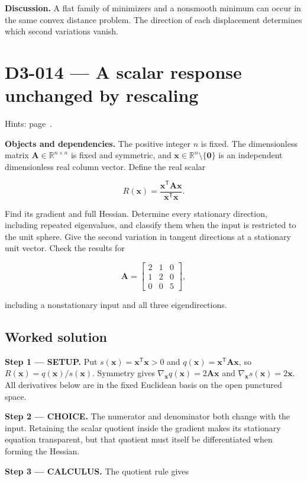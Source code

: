 \documentclass[11pt,oneside,openany]{book}
\begin{document}
\textbf{Discussion.} A flat family of minimizers and a nonsmooth minimum can occur in the same convex distance problem. The direction of each displacement determines which second variations vanish.
\clearpage
\section{D3-014 --- A scalar response unchanged by rescaling}
\label{problem:D3-014}
{\small Hints: page~\pageref{hints:D3-014}.}\par\medskip

\textbf{Objects and dependencies.} The positive integer \(n\) is fixed. The dimensionless matrix \(\mathbf A\in\mathbb R^{n\times n}\) is fixed and symmetric, and \(\mathbf x\in\mathbb R^n\setminus\{\mathbf0\}\) is an independent dimensionless real column vector. Define the real scalar

\[
R(\mathbf x)=\frac{\mathbf x^{\mathsf T}\mathbf A\mathbf x}{\mathbf x^{\mathsf T}\mathbf x}.
\]

Find its gradient and full Hessian. Determine every stationary direction, including repeated eigenvalues, and classify them when the input is restricted to the unit sphere. Give the second variation in tangent directions at a stationary unit vector. Check the results for

\[
\mathbf A=\begin{bmatrix}2&1&0\\1&2&0\\0&0&5\end{bmatrix},
\]

including a nonstationary input and all three eigendirections.
\subsection*{Worked solution}

\textbf{Step 1 --- SETUP.} Put \(s(\mathbf x)=\mathbf x^{\mathsf T}\mathbf x>0\) and \(q(\mathbf x)=\mathbf x^{\mathsf T}\mathbf A\mathbf x\), so \(R(\mathbf x)=q(\mathbf x)/s(\mathbf x)\). Symmetry gives \(\nabla_{\mathbf x}q(\mathbf x)=2\mathbf A\mathbf x\) and \(\nabla_{\mathbf x}s(\mathbf x)=2\mathbf x\). All derivatives below are in the fixed Euclidean basis on the open punctured space.

\begin{ChoiceStep}
\textbf{Step 2 --- CHOICE.} The numerator and denominator both change with the input. Retaining the scalar quotient inside the gradient makes its stationary equation transparent, but that quotient must itself be differentiated when forming the Hessian.

\end{ChoiceStep}
\textbf{Step 3 --- CALCULUS.} The quotient rule gives
\end{document}
